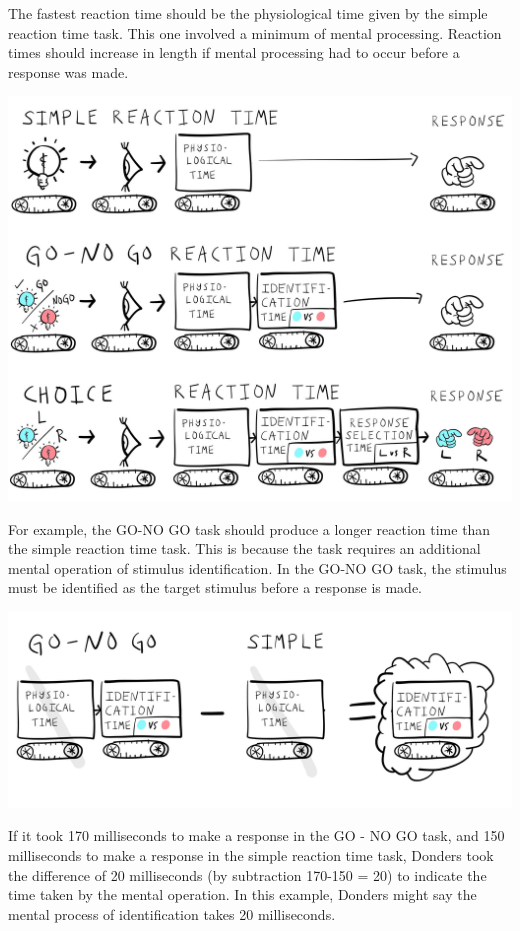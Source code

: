 \documentclass[
  oneside,
  12pt]{crumpbook}
\begin{document}
The fastest reaction time should be the physiological time given by the simple reaction time task. This one involved a minimum of mental processing. Reaction times should increase in length if mental processing had to occur before a response was made.

\begin{center}\includegraphics[width=1\linewidth]{imgs/Donders_task_stages} \end{center}

For example, the GO-NO GO task should produce a longer reaction time than the simple reaction time task. This is because the task requires an additional mental operation of stimulus identification. In the GO-NO GO task, the stimulus must be identified as the target stimulus before a response is made.

\begin{center}\includegraphics[width=1\linewidth]{imgs/Donders_id_time} \end{center}

If it took 170 milliseconds to make a response in the GO - NO GO task, and 150 milliseconds to make a response in the simple reaction time task, Donders took the difference of 20 milliseconds (by subtraction 170-150 = 20) to indicate the time taken by the mental operation. In this example, Donders might say the mental process of identification takes 20 milliseconds.
\end{document}
